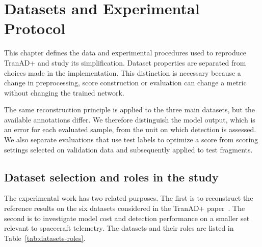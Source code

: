 \chapter{Datasets and Experimental Protocol}
\label{chap:datasets}

This chapter defines the data and experimental procedures used to reproduce
TranAD+ and study its simplification. Dataset properties are separated from
choices made in the implementation. This distinction is necessary because a
change in preprocessing, score construction or evaluation can change a metric
without changing the trained network.

The same reconstruction principle is applied to the three main datasets, but
the available annotations differ. We therefore distinguish the model output,
which is an error for each evaluated sample, from the unit on which detection
is assessed. We also separate evaluations that use test labels to optimize a
score from scoring settings selected on validation data and subsequently
applied to test fragments.

\section{Dataset selection and roles in the study}
\label{sec:datasets-roles}
The experimental work has two related purposes. The first is to reconstruct
the reference results on the six datasets considered in the TranAD+
paper~\cite{Yermakov2025TranADPlus}. The second is to investigate model cost
and detection performance on a smaller set relevant to spacecraft telemetry.
The datasets and their roles are listed in Table~\ref{tab:datasets-roles}.


